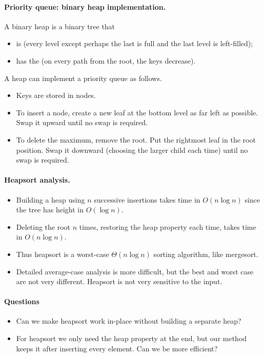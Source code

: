 \paragraph{Priority queue: binary heap implementation.}
\begin{Definition}
A {binary heap} is a binary tree that 
\begin{itemize}
\item is  (every level except perhaps the last is full and 
the last level is left-filled);
\item has the  (on every path from the root, the keys decrease). 
\end{itemize}
\end{Definition}

A heap can implement a priority queue as follows. 
\begin{itemize}
\item Keys are stored in nodes. 
\item To insert a node, create a new leaf at the bottom level as far left as 
possible. Swap it upward until no swap is required. 
\item To delete the maximum, remove the root. Put the rightmost leaf in the root
 position. Swap it downward (choosing the larger child each time) until no swap 
is required. 
\end{itemize}

\paragraph{Heapsort analysis.}
\begin{itemize}
\item Building a heap using $n$ successive insertions takes time in 
$O(n\log n)$ since the tree has height in $O(\log n)$.
\item Deleting the root $n$ times, restoring the heap property each time, takes
 time in $O(n \log n)$.
\item Thus heapsort is a worst-case $\Theta(n \log n)$ sorting algorithm, like 
mergesort. 
\item Detailed average-case analysis is more difficult, but the best and worst 
case are not very different. Heapsort is not very sensitive to the input.
\end{itemize}

\paragraph{Questions}
\begin{itemize}
\item Can we make heapsort work in-place without building a separate heap?
\item For heapsort we only need the heap property at the end, but our method keeps it after inserting every element. 
Can we be more efficient?
\end{itemize}


